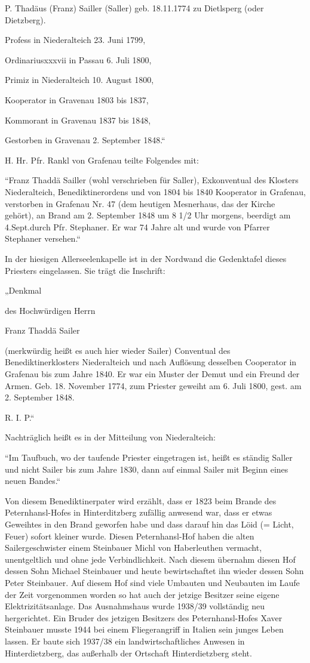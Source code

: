 \documentclass[12pt,a4pager]{book}
\begin{document}
P. Thadäus (Franz) Sailler (Saller) geb. 18.11.1774 zu Dietlsperg (oder
Dietzberg).

Profess in Niederalteich 23. Juni 1799,

Ordinariusxxxvii in  Passau 6. Juli 1800,

Primiz in Niederalteich 10. August 1800,

Kooperator in Gravenau 1803 bis 1837,

Kommorant in Gravenau 1837 bis 1848,

Gestorben in Gravenau 2. September 1848.“

H. Hr. Pfr. Rankl von Grafenau teilte Folgendes mit:

“Franz Thaddä Sailler (wohl verschrieben für Saller), Exkonventual des Klosters
Niederalteich, Benediktinerordens und von 1804 bis 1840 Kooperator in Grafenau,
verstorben in Grafenau Nr. 47 (dem heutigen Mesnerhaus, das der Kirche gehört),
an Brand am 2. September 1848 um 8 1/2 Uhr morgens, beerdigt am 4.Sept.durch Pfr.
Stephaner. Er war 74 Jahre alt und wurde von Pfarrer Stephaner versehen.“

In der hiesigen Allerseelenkapelle ist in der Nordwand die Gedenktafel dieses
Priesters eingelassen. Sie trägt die Inschrift:

„Denkmal

des Hochwürdigen Herrn

Franz Thaddä Sailer

(merkwürdig heißt es auch hier wieder Sailer) Conventual des
Benediktinerklosters Niederalteich und nach Auflösung desselben Cooperator in
Grafenau bis zum Jahre 1840. Er war ein Muster der Demut und ein Freund der
Armen. Geb. 18. November 1774, zum Priester geweiht am 6. Juli 1800, gest. am 2.
September 1848.

R. I. P.“

Nachträglich heißt es in der Mitteilung von Niederalteich:

“Im Taufbuch, wo der taufende Priester eingetragen ist, heißt es ständig Saller
und nicht Sailer bis zum Jahre 1830, dann auf einmal Sailer mit Beginn eines
neuen Bandes.“

Von diesem Benediktinerpater wird erzählt, dass er 1823 beim Brande des
Peternhansl-Hofes in Hinterditzberg zufällig anwesend war, dass er etwas
Geweihtes in den Brand geworfen habe und dass darauf hin das Löid (= Licht,
Feuer) sofort kleiner wurde. Diesen Peternhansl-Hof haben die alten
Sailergeschwister einem Steinbauer Michl von Haberleuthen vermacht,
unentgeltlich und ohne jede Verbindlichkeit. Nach diesem übernahm diesen Hof
dessen Sohn Michael Steinbauer und heute bewirtschaftet ihn wieder dessen Sohn
Peter Steinbauer. Auf diesem Hof sind viele Umbauten und Neubauten im Laufe der
Zeit vorgenommen worden so hat auch der jetzige Besitzer seine eigene
Elektrizitätsanlage. Das Ausnahmshaus wurde 1938/39 vollständig neu
hergerichtet. Ein Bruder des jetzigen Besitzers des Peternhansl-Hofes Xaver
Steinbauer musste 1944 bei einem Fliegerangriff in Italien sein junges Leben
lassen. Er baute sich 1937/38 ein landwirtschaftliches Anwesen in
Hinterdietzberg, das außerhalb der Ortschaft Hinterdietzberg steht.
\end{document}
